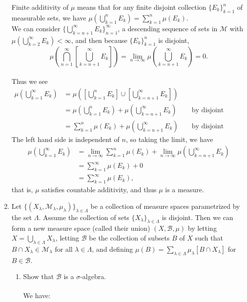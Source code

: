 \begin{enumerate}
	Finite additivity of $\mu$ means that for any finite disjoint collection $\{E_k\}_{k=1}^n$ of measurable sets, we have $\mu(\bigcup_{k=1}^n E_k)=\sum_{k=1}^n\mu(E_k)$.
	\\We can consider $\{\bigcup_{k={n+1}}^\infty E_k\}_{n=1}^\infty$, a descending sequence of sets in $\mathcal{M}$ with $\mu(\bigcup_{k=2}^\infty E_k)<\infty$, and then because $\{E_k\}_{k=1}^n$ is disjoint,
	\[
		\mu ( \bigcap_{n=1}^\infty [\bigcup_{k={n+1}}^\infty E_k]) = \lim_{n \to \infty} \mu(\bigcup_{k={n+1}}^\infty E_k)=0.
	\]
	\\Thus we see
	\begin{align*}
		\mu(\bigcup_{k=1}^\infty E_k)&=\mu([\bigcup_{k=1}^n E_k]\cup[\bigcup_{k={n+1}}^\infty E_k])\\
		&=\mu(\bigcup_{k=1}^n E_k)+\mu(\bigcup_{k={n+1}}^\infty E_k)&&\text{ by disjoint additivity}\\
		&=\sum_{k=1}^n\mu( E_k)+\mu(\bigcup_{k={n+1}}^\infty E_k)&&\text{ by disjoint additivity}
	\end{align*}
	The left hand side is independent of $n$, so taking the limit, we have
	\begin{align*}
		\mu(\bigcup_{k=1}^\infty E_k)&=\lim_{n\to\infty}\sum_{k=1}^n\mu( E_k)+\lim_{n\to\infty}\mu(\bigcup_{k={n+1}}^\infty E_k)\\
		&=\sum_{k=1}^\infty\mu( E_k)+0\\
		&=\sum_{k=1}^\infty\mu( E_k),
	\end{align*}
	that is, $\mu$ satisfies countable additivity, and thus $\mu$ is a measure.
	\item Let $\{(X_\lambda,\mathcal{M}_\lambda,\mu_\lambda)\}_{\lambda\in\Lambda}$ be a collection of measure spaces parametrized by the set $\Lambda$.
	Assume the collection of sets $\{X_\lambda\}_{\lambda\in\Lambda}$ is disjoint.
	Then we can form a new measure space (called their union) $(X,\mathcal{B},\mu)$ by letting $X=\bigcup_{\lambda\in\Lambda}X_\lambda$, letting $\mathcal{B}$ be the collection of subsets $B$ of $X$ such that $B\cap X_\lambda\in\mathcal{M}_\lambda$ for all $\lambda\in\Lambda$, and defining $\mu(B)=\sum_{\lambda\in\Lambda}\mu_\lambda[B\cap X_\lambda]$ for $B\in\mathcal{B}$.
	\begin{enumerate}[label=(\roman*),align=left]   
		\item Show that $\mathcal{B}$ is a $\sigma$-algebra.\\
		\\We have:
		\begin{enumerate}[label=(\roman*),align=left]   

\end{enumerate}
\end{enumerate}
\end{enumerate}
